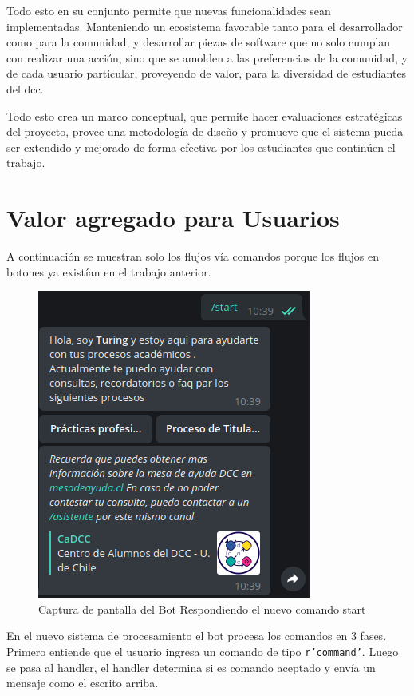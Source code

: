     \par Todo esto en su conjunto permite que nuevas funcionalidades sean implementadas. Manteniendo un ecosistema favorable tanto para el desarrollador como para la comunidad, y desarrollar piezas de software que no solo cumplan con realizar una acción, sino que se amolden a las preferencias de la comunidad, y de cada usuario particular, proveyendo de valor, para la diversidad de estudiantes del dcc.
    \par Todo esto crea un marco conceptual, que permite hacer evaluaciones estratégicas del proyecto, provee una metodología de diseño y promueve que el sistema pueda ser extendido y mejorado de forma efectiva por los estudiantes que continúen el trabajo.

\newpage
\section{Valor agregado para Usuarios}
    A continuación se muestran solo los flujos vía comandos porque los flujos en botones ya existían en el trabajo anterior.
   
    \begin{figure}[h!]
        \centering
        \includegraphics[scale=0.5]{media/imagenes/sc/start.png}
        \caption[Bot start]{Captura de pantalla del Bot Respondiendo el nuevo comando start}
    \end{figure}
    
    \par En el nuevo sistema de procesamiento el bot procesa los comandos en 3 fases. Primero entiende que el usuario ingresa un comando de tipo \texttt{r'\/command'}. Luego se pasa al handler, el handler determina si es comando aceptado y envía un mensaje como el escrito arriba.

